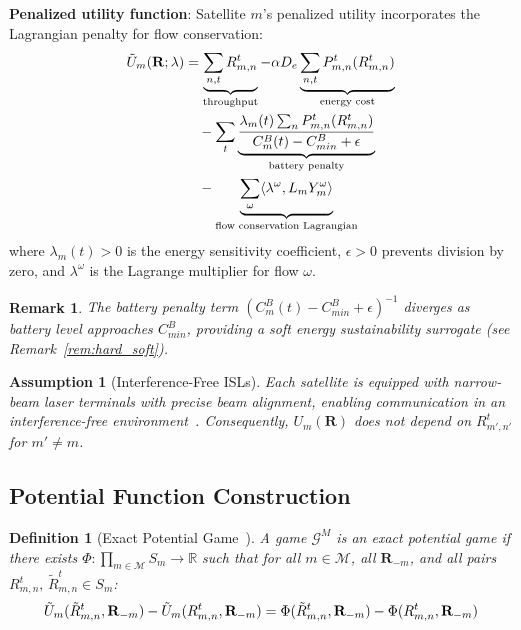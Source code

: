 \documentclass[journal]{IEEEtran}
\newtheorem{definition}{Definition}
\newtheorem{remark}{Remark}
\newtheorem{assumption}{Assumption}
\newcommand{\CB}{C^{B}}
\newcommand{\CBmin}{C^{B}_{min}}
\newcommand{\calM}{\mathcal{M}}
\newcommand{\calG}{\mathcal{G}}
\newcommand{\bfR}{\mathbf{R}}
\newcommand{\Rmn}{R_{m,n}^{t}}
\begin{document}
\textbf{Penalized utility function}: Satellite $m$'s
penalized utility incorporates the Lagrangian penalty for flow conservation:
\begin{align}
    \tilde{U}_m(\bfR;\lambda) &=
    \underbrace{\sum_{n,t} \Rmn}_{\text{throughput}}
    - \alpha D_e \underbrace{\sum_{n,t}
    P_{m,n}^t(\Rmn)}_{\text{energy cost}}
    \notag\\
    &\quad - \sum_t
    \underbrace{\frac{\lambda_m(t)
    \sum_n P_{m,n}^t(\Rmn)}%
    {\CB_m(t)-\CBmin+\epsilon}}_{\text{battery penalty}}
    \notag\\
    &\quad - \underbrace{\sum_\omega \langle
    \lambda^{\omega},
    L_m Y_m^\omega \rangle}_{\text{flow conservation
    Lagrangian}}
    \label{eq:utility}
\end{align}
where $\lambda_m(t)>0$ is the energy sensitivity coefficient, $\epsilon>0$ prevents division by zero, and $\lambda^\omega$ is the Lagrange multiplier for flow $\omega$.

\begin{remark}
The battery penalty term $(\CB_m(t)-\CBmin+\epsilon)^{-1}$ diverges as battery level approaches $\CBmin$, providing a soft energy sustainability surrogate (see Remark~\ref{rem:hard_soft}).
\end{remark}

\begin{assumption}[Interference-Free ISLs]
\label{assm:interference_free}
Each satellite is equipped with narrow-beam laser terminals with precise beam alignment, enabling communication in an interference-free environment~\cite{li2023energy,li2023deepisl}. Consequently, $U_m(\bfR)$ does not depend on $R_{m',n'}^t$ for $m'\neq m$.
\end{assumption}

\subsection{Potential Function Construction}

\begin{definition}[Exact Potential Game~\cite{monderer1996potential}]
A game $\calG^M$ is an \emph{exact potential game} if there exists $\Phi:\prod_{m\in\calM} S_m\to\mathbb{R}$ such that for all $m\in\calM$, all $\bfR_{-m}$, and all pairs $R_{m,n}^t,\,\tilde{R}_{m,n}^t\in S_m$:
\begin{equation}
    \small
    \tilde{U}_m(\tilde{R}_{m,n}^t,\bfR_{-m})
    - \tilde{U}_m(R_{m,n}^t,\bfR_{-m})
    = \Phi(\tilde{R}_{m,n}^t,\bfR_{-m})
    - \Phi(R_{m,n}^t,\bfR_{-m})
    \label{eq:epg_def}
\end{equation}
\end{definition}
\end{document}
